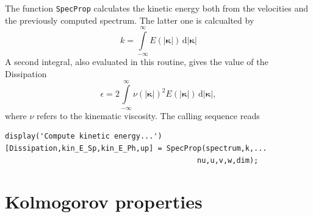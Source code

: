 \documentclass[preprint,12pt,ntfdMod]{elsarticle}
\begin{document}
\begin{par}

  The function \lstinline!SpecProp! calculates the kinetic energy both
  from the velocities and the previously computed spectrum. The latter
  one is calcualted by
  \begin{equation}
      k = \int\limits_{-\infty}^{\infty} E(|\boldsymbol\kappa|)\,\mathrm{d}|\boldsymbol\kappa|
  \end{equation}
  A second integral, also evaluated in this routine, gives the value
  of the Dissipation
  \begin{equation}
      \epsilon = 2\int\limits_{-\infty}^{\infty}\nu(|\boldsymbol\kappa|)^2
      E(|\boldsymbol\kappa|)\,\mathrm{d}|\boldsymbol\kappa|,
  \end{equation}
  where $\nu$ refers to the kinematic viscosity.
  The calling sequence reads

\end{par} \vspace{1em}
\begin{verbatim}
display('Compute kinetic energy...')
[Dissipation,kin_E_Sp,kin_E_Ph,up] = SpecProp(spectrum,k,...
                                            nu,u,v,w,dim);
\end{verbatim}
\begin{par}



\end{par} \vspace{1em}


\section{Kolmogorov properties}
\end{document}
